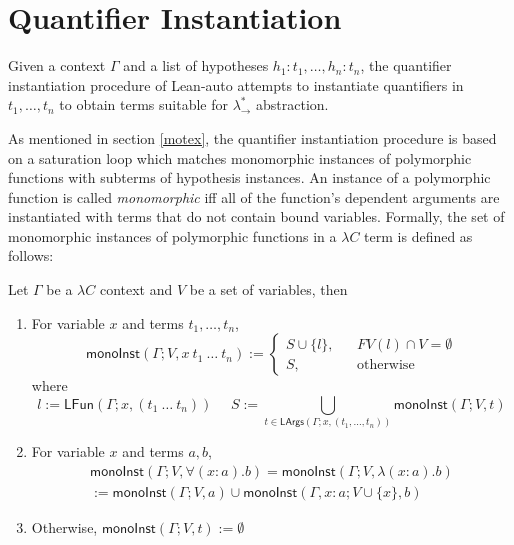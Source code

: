 \section{Quantifier Instantiation}
Given a context $\Gamma$ and a list of hypotheses $h_1 : t_1, \dots, h_n : t_n$, the quantifier
instantiation procedure of Lean-auto attempts to instantiate quantifiers in
$t_1, \dots, t_n$ to obtain terms suitable for $\lambda_\to^*$ abstraction.

\noindent As mentioned in section \ref{motex}, the quantifier instantiation procedure
is based on a saturation loop which matches monomorphic instances of polymorphic functions
with subterms of hypothesis instances. An instance of a polymorphic function is called
\textit{monomorphic} iff all of the function's dependent arguments are instantiated with terms
that do not contain bound variables. Formally, the set of monomorphic instances of polymorphic
functions in a $\lambda C$ term is defined as follows:

\begin{definition}
  Let $\Gamma$ be a $\lambda C$ context and $V$ be a set of variables, then
  \begin{enumerate}
    \item For variable $x$ and terms $t_1, \dots, t_n$,
      $$\mathsf{monoInst}(\Gamma; V, x \ t_1 \ \dots \ t_n) := \left\{
        \begin{aligned}
          S \cup \{l\}, & & FV(l) \cap V = \emptyset \\
          S, & & \text{otherwise}
        \end{aligned}
      \right.$$
      where
      $$l := \mathsf{LFun}(\Gamma; x, (t_1 \ \dots \ t_n)) \ \ \ \ \ \ S := \bigcup_{t \in \mathsf{LArgs}(\Gamma; x, (t_1, \dots, t_n))} \mathsf{monoInst}(\Gamma; V, t)$$
    \item For variable $x$ and terms $a, b$,
      \begin{align*}
        \mathsf{monoInst}(\Gamma; V, \forall (x : a). b) = \mathsf{monoInst}(\Gamma; V, \lambda (x : a). b) 
        \\ := \mathsf{monoInst}(\Gamma; V, a) \cup \mathsf{monoInst}(\Gamma, x : a; V \cup \{x\}, b)
      \end{align*}
    \item Otherwise, $\mathsf{monoInst}(\Gamma; V, t) := \emptyset$
  \end{enumerate}
\end{definition}

